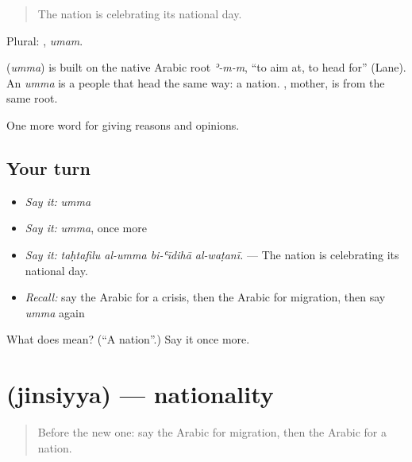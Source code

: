 \begin{quote}
The nation is celebrating its national day.
\end{quote}

Plural: , \emph{umam}.

\begin{cousinweb}
\textbf{} (\emph{umma}) is built on the native Arabic root \emph{ʾ-m-m}, \textquotedblleft{}to aim at, to head for\textquotedblright{} (Lane). An \emph{umma} is a people that head the same way: a nation. , mother, is from the same root.
\end{cousinweb}

\begin{grammarlens}[title={What you've built}]
One more word for giving reasons and opinions.
\end{grammarlens}

\subsection*{Your turn}
\begin{itemize}
\raggedright
  \item \emph{Say it:} \emph{umma}
  \item \emph{Say it:} \emph{umma}, once more
  \item \emph{Say it:} \emph{taḥtafilu al-umma bi-ʿīdihā al-waṭanī.} — The nation is celebrating its national day.
  \item \emph{Recall:} say the Arabic for a crisis, then the Arabic for migration, then say \emph{umma} again
\end{itemize}

\begin{tcolorbox}[breakable,colback=teal!4,colframe=teal!35!black,title={Before you move on}]
What does  mean? (\textquotedblleft{}A nation\textquotedblright{}.) Say it once more.
\end{tcolorbox}
\section[\texorpdfstring{\ar{جنسية} (jinsiyya)}{جنسية (jinsiyya)}]{ (jinsiyya) — nationality}

\label{lesson:AR-C387-jinsiyya}



\begin{quote}
Before the new one: say the Arabic for migration, then the Arabic for a nation.
\end{quote}

